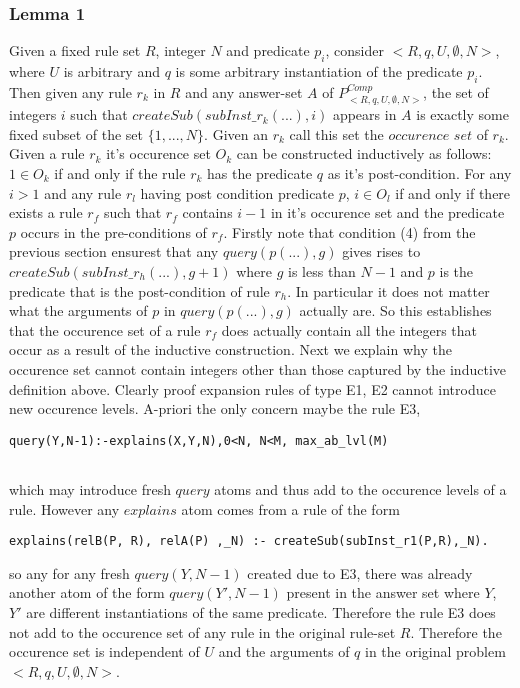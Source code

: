 \documentclass[sigconf]{acmart}
\begin{document}
\subsubsection{Lemma 1}
Given a fixed rule set $R$, integer $N$ and predicate $p_{i}$, consider $<R,q,U,\emptyset,N>$, where $U$ is arbitrary and $q$ is some arbitrary instantiation of the predicate $p_{i}$. Then given any rule $r_{k}$ in $R$ and any answer-set $A$ of $P_{<R,q,U,\emptyset,N>}^{Comp}$, the set of integers $i$ such that $createSub(subInst\_r_{k}(...),i)$ appears in $A$ is exactly some fixed subset of the set $\{1,...,N\}$. Given an $r_{k}$ call this set the $\textit{occurence set}$ of $r_{k}$. Given a rule $r_{k}$ it's occurence set $O_{k}$ can be constructed inductively as follows:\\
$1 \in O_{k}$ if and only if the rule $r_{k}$ has the predicate $q$ as it's
post-condition. For any $i>1$ and any rule $r_{l}$ having post condition
predicate $p$, $i\in O_{l}$ if and only if there exists a rule $r_{f}$ such
that $r_{f}$ contains $i-1$ in it's occurence set and the predicate $p$ occurs
in the pre-conditions of $r_{f}$. Firstly note that condition (4) from the
previous section ensurest that any $query(p(...),g)$ gives rises to
$createSub(subInst\_r_{h}(...),g+1)$ where $g$ is less than $N-1$ and $p$ is
the predicate that is the post-condition of rule $r_{h}$. In particular it
does not matter what the arguments of $p$ in $query(p(...),g)$ actually
are. So this establishes that the occurence set of a rule $r_{f}$ does
actually contain all the integers that occur as a result of the inductive
construction. Next we explain why the occurence set cannot contain integers
other than those captured by the inductive definition above. Clearly proof
expansion rules of type E1, E2 cannot introduce new occurence levels. A-priori
the only concern maybe the rule E3,
\begin{verbatim}
query(Y,N-1):-explains(X,Y,N),0<N, N<M, max_ab_lvl(M)
    
\end{verbatim} 
which may introduce fresh $query$ atoms and thus add to the occurence levels of a rule. However any $explains$ atom comes from a rule of the form 
\begin{verbatim}
explains(relB(P, R), relA(P) ,_N) :- createSub(subInst_r1(P,R),_N).
\end{verbatim} 
so any for any fresh $query(Y,N-1)$ created due to E3, there was already another atom of the form $query(Y',N-1)$ present in the answer set where $Y$, $Y'$ are different instantiations of the same predicate. Therefore the rule E3 does not add to the occurence set of any rule in the original rule-set $R$. Therefore the occurence set is independent of $U$ and the arguments of $q$ in the original problem $<R,q,U,\emptyset,N>$.
\end{document}
